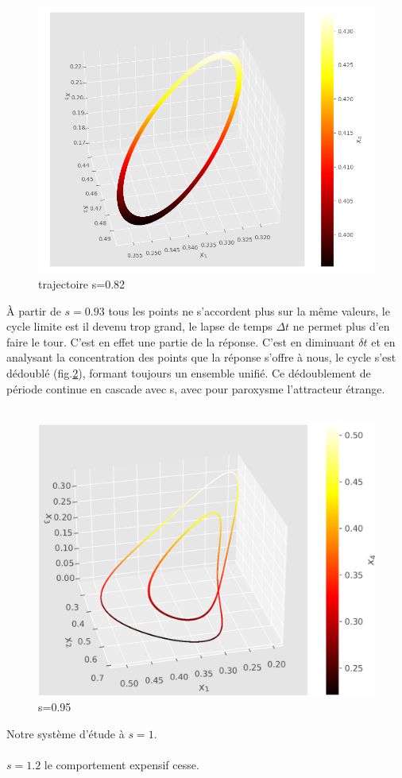\documentclass{wsdcr}
\begin{document}
 \begin{figure}
    \centering
    \includegraphics[width=\linewidth]{fig/lv4_1cl4.png}
    \caption{trajectoire s=0.82}
    \label{fig:1cl4}
\end{figure}
À partir de $s=0.93$ tous les points ne s'accordent plus sur la même valeurs, le cycle limite est il devenu trop grand, le lapse de temps $\Delta t$ ne permet plus d'en faire le tour. C'est en effet une partie de la réponse. C'est en diminuant $\delta t$ et en analysant la concentration des points que la réponse s'offre à nous, le cycle s'est dédoublé (fig.\ref{fig:cl4}), formant toujours un ensemble unifié. Ce dédoublement de période continue en cascade avec s, avec pour paroxysme l'attracteur étrange.  \\ \\
\begin{figure}
    \centering
    \includegraphics[width=\linewidth]{fig/lv4_cl4.png}
    \caption{s=0.95}
    \label{fig:cl4}
\end{figure}
Notre système d'étude à $s=1$.
\\ \\
$s=1.2$ le comportement expensif cesse.
\end{document}
